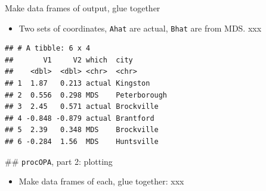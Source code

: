 \documentclass[ignorenonframetext,]{beamer}
\newenvironment{Shaded}{\begin{snugshade}}{\end{snugshade}}
\newcommand{\DataTypeTok}[1]{\textcolor[rgb]{0.13,0.29,0.53}{#1}}
\newcommand{\DecValTok}[1]{\textcolor[rgb]{0.00,0.00,0.81}{#1}}
\newcommand{\KeywordTok}[1]{\textcolor[rgb]{0.13,0.29,0.53}{\textbf{#1}}}
\newcommand{\NormalTok}[1]{#1}
\newcommand{\OperatorTok}[1]{\textcolor[rgb]{0.81,0.36,0.00}{\textbf{#1}}}
\newcommand{\StringTok}[1]{\textcolor[rgb]{0.31,0.60,0.02}{#1}}
\providecommand{\tightlist}{%
  \setlength{\itemsep}{0pt}\setlength{\parskip}{0pt}}
\begin{document}
\begin{frame}[fragile]{Make data frames of output, glue together}
\protect\hypertarget{make-data-frames-of-output-glue-together}{}

\begin{itemize}
\tightlist
\item
  Two sets of coordinates, \texttt{Ahat} are actual, \texttt{Bhat} are
  from MDS. xxx
\end{itemize}

\scriptsize

\begin{Shaded}
\end{Shaded}

\begin{verbatim}
## # A tibble: 6 x 4
##       V1     V2 which  city        
##    <dbl>  <dbl> <chr>  <chr>       
## 1  1.87   0.213 actual Kingston    
## 2  0.556  0.298 MDS    Peterborough
## 3  2.45   0.571 actual Brockville  
## 4 -0.848 -0.879 actual Brantford   
## 5  2.39   0.348 MDS    Brockville  
## 6 -0.284  1.56  MDS    Huntsville
\end{verbatim}

\normalsize

\#\# \texttt{procOPA}, part 2: plotting

\begin{itemize}
\tightlist
\item
  Make data frames of each, glue together: xxx
\end{itemize}

\small


\end{frame}
\end{document}
